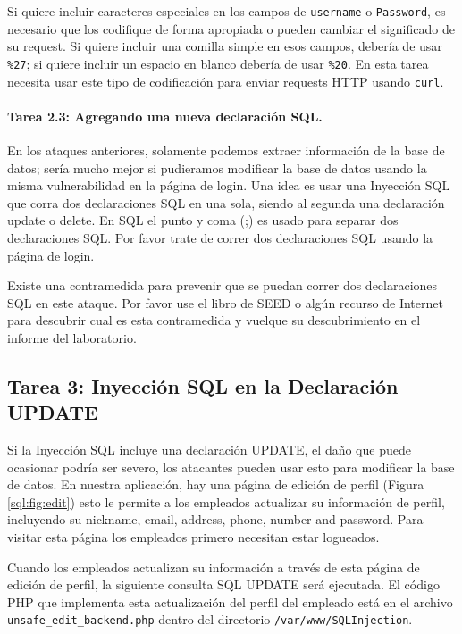 Si quiere incluir caracteres especiales en los campos de \texttt{username} o \texttt{Password}, es necesario que los codifique de forma apropiada o pueden cambiar el significado de su request. Si quiere incluir una comilla simple en esos campos, debería de usar \texttt{\%27}; si quiere incluir un espacio en blanco debería de usar \texttt{\%20}. En esta tarea necesita usar este tipo de codificación para enviar requests HTTP usando \texttt{curl}.


\paragraph{Tarea 2.3: Agregando una nueva declaración SQL.} 
En los ataques anteriores, solamente podemos extraer información de la base de datos; sería mucho mejor si pudieramos modificar la base de datos usando la misma vulnerabilidad en la página de login. Una idea es usar una Inyección SQL que corra dos declaraciones SQL en una sola, siendo al segunda una declaración update o delete. En SQL el punto y coma (;) es usado para separar dos declaraciones SQL. Por favor trate de correr dos declaraciones SQL usando la página de login.

Existe una contramedida para prevenir que se puedan correr dos declaraciones SQL en este ataque. Por favor use el libro de SEED o algún recurso de Internet para descubrir cual es esta contramedida y vuelque su descubrimiento en el informe del laboratorio.


\subsection{Tarea 3: Inyección SQL en la Declaración UPDATE} 

Si la Inyección SQL incluye una declaración UPDATE, el daño que puede ocasionar podría ser severo, los atacantes pueden usar esto para modificar la base de datos.
En nuestra aplicación, hay una página de edición de perfil (Figura   \ref{sql:fig:edit}) esto le permite a los empleados actualizar su información de perfil, incluyendo su nickname, email, address, phone, number and password. Para visitar esta página los empleados primero necesitan estar logueados.

Cuando los empleados actualizan su información a través de esta página de edición de perfil, la siguiente consulta SQL UPDATE será ejecutada. El código PHP que implementa esta actualización del perfil del empleado está en el archivo {\tt unsafe\_edit\_backend.php} dentro del directorio {\tt /var/www/SQLInjection}.


